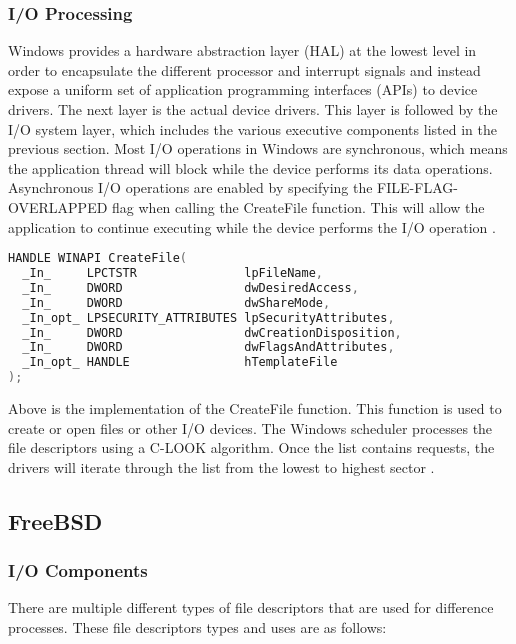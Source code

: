 \documentclass[letterpaper,draftclsnofoot,10pt,onecolumn,titlepage]{IEEEtran}\usepackage[margin=0.75in]{geometry}
\begin{document}
        \subsubsection{I/O Processing}
        Windows provides a hardware abstraction layer (HAL) at the lowest level in order to encapsulate the different
        processor and interrupt signals and instead expose a uniform set of application programming interfaces (APIs)
        to device drivers. The next layer is the actual device drivers. This layer is followed by the I/O system
        layer, which includes the various executive components listed in the previous section. Most I/O
        operations in Windows are synchronous, which means the application thread will block while the device
        performs its data operations. Asynchronous I/O operations are enabled by specifying the FILE-FLAG-OVERLAPPED
        flag when calling the CreateFile function. This will allow the application to continue executing while the
        device performs the I/O operation \cite{windows}.

\begin{lstlisting}[language=C++]
HANDLE WINAPI CreateFile(
  _In_     LPCTSTR               lpFileName,
  _In_     DWORD                 dwDesiredAccess,
  _In_     DWORD                 dwShareMode,
  _In_opt_ LPSECURITY_ATTRIBUTES lpSecurityAttributes,
  _In_     DWORD                 dwCreationDisposition,
  _In_     DWORD                 dwFlagsAndAttributes,
  _In_opt_ HANDLE                hTemplateFile
); 
\end{lstlisting}

        Above is the implementation of the CreateFile function. This function is used to create or open files or
        other I/O devices. The Windows scheduler processes the file descriptors using a C-LOOK algorithm. Once
        the list contains requests, the drivers will iterate through the list from the lowest to highest sector
        \cite{Windows_CreateFile}.

    \subsection{FreeBSD}
        \subsubsection{I/O Components}
        There are multiple different types of file descriptors that are used for difference processes. These 
        file descriptors types and uses are as follows:
\end{document}

